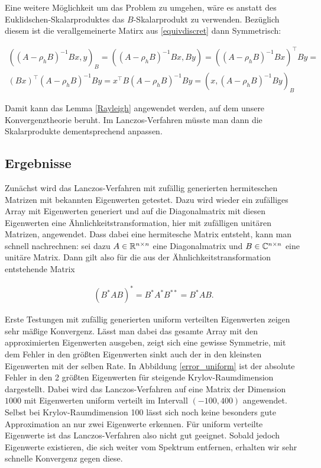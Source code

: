 \documentclass{article}
\theoremstyle{plain}
\begin{document}
Eine weitere Möglichkeit um das Problem zu umgehen, wäre es anstatt des Euklidschen-Skalarproduktes das $B$-Skalarprodukt zu verwenden. Bezüglich diesem ist die verallgemeinerte Matirx aus \eqref{equivdiscret} dann Symmetrisch:

\begin{align*}
	((A - \rho_h B)^{-1} Bx, y)_B =
	((A - \rho_h B)^{-1} Bx, By) =
	((A - \rho_h B)^{-1} Bx)^\top By = \\
	(Bx)^\top (A - \rho_h B)^{-1}By =
	x^\top B(A - \rho_h B)^{-1}By =
	(x,(A - \rho_h B)^{-1}By)_B
\end{align*}

Damit kann das Lemma \ref{Rayleigh} angewendet werden, auf dem unsere Konvergenztheorie beruht. Im Lanczos-Verfahren müsste man dann die Skalarprodukte dementsprechend anpassen.

\subsection{Ergebnisse}\label{ergebnisse}

Zunächst wird das Lanczos-Verfahren mit zufällig generierten hermiteschen Matrizen mit bekannten Eigenwerten getestet. Dazu wird wieder ein zufälliges Array mit Eigenwerten generiert und auf die Diagonalmatrix mit diesen Eigenwerten eine Ähnlichkeitstransformation, hier mit zufälligen unitären Matrizen, angewendet. Dass dabei eine hermitesche Matrix entsteht, kann man schnell nachrechnen: sei dazu $A \in \mathbb{R}^{n\times n}$ eine Diagonalmatrix und $B \in \mathbb{C}^{n\times n}$ eine unitäre Matrix. Dann gilt also für die aus der Ähnlichkeitstransformation entstehende Matrix

\begin{align*}
	(B^* A B)^*
	=
	B^* A^* B^{**}
	=
		B^* A B.
\end{align*}

Erste Testungen mit zufällig generierten uniform verteilten Eigenwerten zeigen sehr mäßige Konvergenz. Lässt man dabei das gesamte Array mit den approximierten Eigenwerten ausgeben, zeigt sich eine gewisse Symmetrie, mit dem Fehler in den größten Eigenwerten sinkt auch der in den kleinsten Eigenwerten mit der selben Rate. In Abbildung \ref{error_uniform} ist der absolute Fehler in den 2 größten Eigenwerten für steigende Krylov-Raumdimension dargestellt. Dabei wird das Lanczos-Verfahren auf eine Matrix der Dimension $1000$ mit Eigenwerten uniform verteilt im Intervall $(-100,400)$ angewendet. Selbst bei Krylov-Raumdimension 100 lässt sich noch keine besonders gute Approximation an nur zwei Eigenwerte erkennen. Für uniform verteilte Eigenwerte ist das Lanczos-Verfahren also nicht gut geeignet. Sobald jedoch Eigenwerte existieren, die sich weiter vom Spektrum entfernen, erhalten wir sehr schnelle Konvergenz gegen diese.
\end{document}
